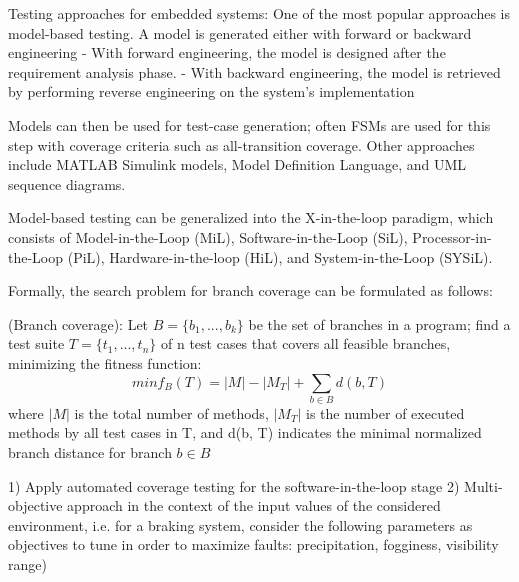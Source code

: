Testing approaches for embedded systems:
One of the most popular approaches is model-based testing. A model is generated either with forward or backward engineering
	- With forward engineering, the model is designed after the requirement analysis phase.
	- With backward engineering, the model is retrieved by performing reverse engineering on the system's implementation

Models can then be used for test-case generation; often FSMs are used for this step with coverage criteria such as all-transition coverage. Other approaches include MATLAB Simulink models, Model Definition Language, and UML sequence diagrams.

Model-based testing can be generalized into the X-in-the-loop paradigm, which consists of Model-in-the-Loop (MiL), Software-in-the-Loop (SiL), Processor-in-the-Loop (PiL), Hardware-in-the-loop (HiL), and System-in-the-Loop (SYSiL).



Formally, the search problem for branch coverage can be formulated as follows:

\begin{problem}(Branch coverage):
    Let $ B = \{b_1,...,b_k\} $ be the set of branches in a program; find a test suite $ T = \{t_1,...,t_n \} $ of n test cases that covers all feasible branches, minimizing the fitness function:
    \begin{equation}
        min f_B (T) = |M| - |M_T| + \sum_{b \in B} d(b, T)
    \end{equation}
    where $|M|$ is the total number of methods, $|M_T|$ is the number of executed methods by all test cases in T, and d(b, T) indicates the minimal normalized branch distance for branch $ b \in B $
\end{problem}



1) Apply automated coverage testing for the software-in-the-loop stage
2) Multi-objective approach in the context of the input values of the considered environment, i.e. for a braking system, consider the following parameters as objectives to tune in order to maximize faults: precipitation, fogginess, visibility range)
